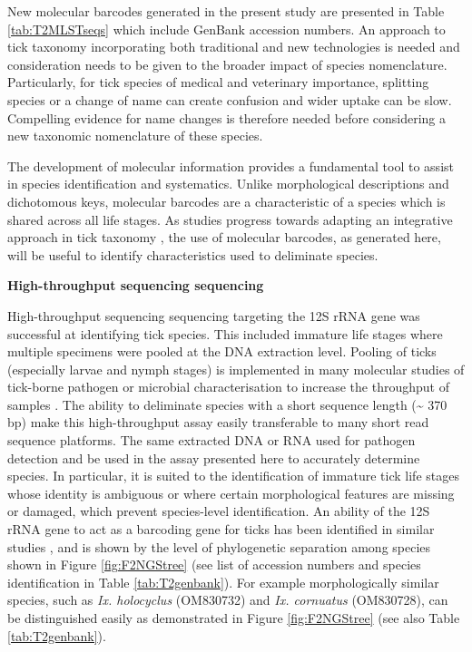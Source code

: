 \documentclass[a4paper, nobind]{templates/ociamthesis}
\begin{document}
New molecular barcodes generated in the present study are presented in Table \ref{tab:T2MLSTseqs} which include GenBank accession numbers.
An approach to tick taxonomy incorporating both traditional and new technologies is needed and consideration needs to be given to the broader impact of species nomenclature.
Particularly, for tick species of medical and veterinary importance, splitting species or a change of name can create confusion and wider uptake can be slow.
Compelling evidence for name changes is therefore needed before considering a new taxonomic nomenclature of these species.

The development of molecular information provides a fundamental tool to assist in species identification and systematics.
Unlike morphological descriptions and dichotomous keys, molecular barcodes are a characteristic of a species which is shared across all life stages.
As studies progress towards adapting an integrative approach in tick taxonomy \autocite{dantas-torresSpeciesConceptsWhat2018}, the use of molecular barcodes, as generated here, will be useful to identify characteristics used to deliminate species.

\textbf{High-throughput sequencing sequencing}

High-throughput sequencing sequencing targeting the 12S rRNA gene was successful at identifying tick species.
This included immature life stages where multiple specimens were pooled at the DNA extraction level.
Pooling of ticks (especially larvae and nymph stages) is implemented in many molecular studies of tick-borne pathogen or microbial characterisation to increase the throughput of samples \autocite{estrada-penaPitfallsTickTickBorne2021}.
The ability to deliminate species with a short sequence length (\textasciitilde{} 370 bp) make this high-throughput assay easily transferable to many short read sequence platforms.
The same extracted DNA or RNA used for pathogen detection and be used in the assay presented here to accurately determine species.
In particular, it is suited to the identification of immature tick life stages whose identity is ambiguous or where certain morphological features are missing or damaged, which prevent species-level identification.
An ability of the 12S rRNA gene to act as a barcoding gene for ticks has been identified in similar studies \autocite{lvAssessmentFourDNA2014,kandumaMitochondrialNuclearMultilocus2019}, and is shown by the level of phylogenetic separation among species shown in Figure \ref{fig:F2NGStree} (see list of accession numbers and species identification in Table \ref{tab:T2genbank}).
For example morphologically similar species, such as \emph{Ix. holocyclus} (OM830732) and \emph{Ix. cornuatus} (OM830728), can be distinguished easily as demonstrated in Figure \ref{fig:F2NGStree} (see also Table \ref{tab:T2genbank}).
\end{document}
